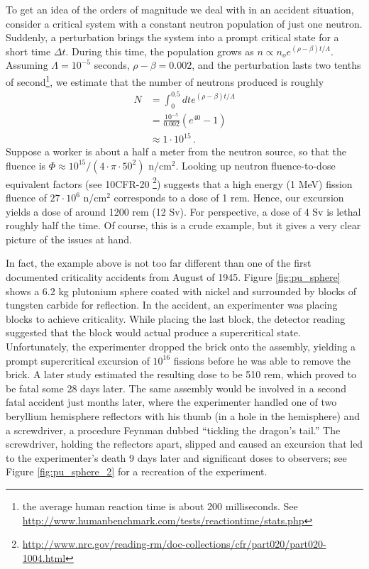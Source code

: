 To get an idea of the orders of magnitude we deal with in an accident
situation, consider a critical system with a constant neutron population
of just one neutron.  Suddenly, a perturbation brings the system
into a prompt critical state for a short time $\Delta t$.  During this
time, the population grows as $n \propto n_o e^{(\rho-\beta)t/\Lambda}$.  
Assuming $\Lambda = 10^{-5}$ seconds, $\rho-\beta = 0.002$, and the perturbation 
lasts two tenths of second\footnote{the average human reaction time is
about 200 milliseconds. 
See \url{http://www.humanbenchmark.com/tests/reactiontime/stats.php}}, 
we estimate that the number of neutrons produced is 
roughly
\begin{equation}
\begin{split}
 N &= \int^{0.5}_0 dt e^{(\rho-\beta)t/\Lambda} \\
   &= \frac{10^{-5}}{0.002} (e^{40} - 1) \\
   &\approx 1 \cdot 10^{15} \, .
\end{split}
\end{equation}
Suppose a worker is about a half a meter from the neutron source, so that
the fluence is $\Phi \approx 10^{15} / (4\cdot \pi \cdot 50^2)$ n/cm$^2$.
Looking up neutron fluence-to-dose equivalent factors (see 10CFR-20
\footnote{\url{http://www.nrc.gov/reading-rm/doc-collections/cfr/part020/part020-1004.html}}) 
suggests
that a high energy (1 MeV) fission fluence of $27\cdot 10^6$  n/cm$^2$
corresponds
to a dose of 1 rem.  Hence, our excursion yields a dose of around
1200 rem (12 Sv).  For perspective, a dose of 4 Sv is lethal roughly 
half the time.  Of course, this is a crude example, but it gives a 
very clear picture of the issues at hand.

In fact, the example above is not too far different than one of the first
documented criticality accidents from August of 1945.
Figure \ref{fig:pu_sphere} shows
a 6.2 kg plutonium sphere coated with nickel and surrounded by
blocks of tungsten carbide for reflection.  In the accident, an 
experimenter was placing blocks to achieve criticality.  While
placing the last block, the detector reading suggested that 
the block would actual produce a supercritical state.  Unfortunately,
the experimenter dropped the brick onto the assembly, yielding
a prompt supercritical excursion of $10^{16}$ fissions
before he was able to remove the brick.  A later study estimated
the resulting dose to be 510 rem, which proved to be fatal some
28 days later.  The same assembly would be involved in a second
fatal accident just months later, where the experimenter handled
one of two beryllium hemisphere reflectors
 with his thumb (in a hole in the 
hemisphere) and a screwdriver, a procedure Feynman dubbed
``tickling the dragon's tail.''   The screwdriver, holding the 
reflectors apart, slipped and caused an excursion that led to 
the experimenter's death 9 days later and significant doses
to observers; see Figure \ref{fig:pu_sphere_2} for a recreation
of the experiment.

